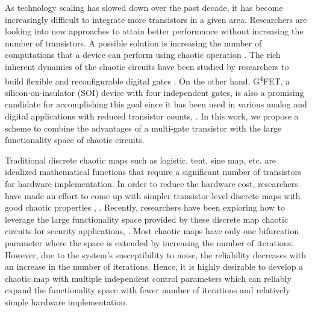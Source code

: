 \documentclass[conference]{IEEEtran}
\begin{document}
 As technology scaling has slowed down over the past decade, it has become increasingly difficult to integrate more transistors in a given area. Researchers are looking into new approaches to attain better performance without increasing the number of transistors. A possible solution is increasing the number of computations that a device can perform using chaotic operation \cite{kia2017integrated}. The rich inherent dynamics of the chaotic circuits have been studied by researchers to build flexible and reconfigurable digital gates \cite{kia2015nonlinear}. On the other hand, G\textsuperscript4FET, a silicon-on-insulator (SOI) device with four independent gates, is also a promising candidate for accomplishing this goal since it has been used in various analog and digital applications with reduced transistor counts\cite{akarvardar2006four}, \cite{akarvardar2005novel}. In this work, we propose a scheme to combine the advantages of a multi-gate transistor with the large functionality space of chaotic circuits.  %


Traditional discrete chaotic maps such as logistic, tent, sine map, etc. are idealized mathematical functions that require a significant number of transistors for hardware implementation. In order to reduce the hardware cost, researchers have made an effort to come up with simpler transistor-level discrete maps with good chaotic properties \cite{kia2017integrated}, \cite{dudek2003compact}. Recently, researchers have been exploring how to leverage the large functionality space provided by these discrete map chaotic circuits for security applications\cite{hua2015dynamic}, \cite{hasan2020chaos}. Most chaotic maps have only one bifurcation parameter where the space is extended by increasing the number of iterations. However, due to the system's susceptibility to noise, the reliability decreases with an increase in the number of iterations. Hence, it is highly desirable to develop a chaotic map with multiple independent control parameters which can reliably expand the functionality space with fewer number of iterations and relatively simple hardware implementation.
\end{document}
